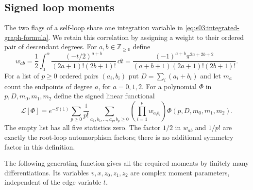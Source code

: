 \subsection{Signed loop moments}
\label{subsec:a:02}

The two flags of a self-loop share one integration variable in
\eqref{eq:s03:integrated-graph-formula}. We retain this correlation by
assigning a weight to their ordered pair of descendant degrees. For
$a,b\in\mathbb Z_{\geq0}$ define
\begin{equation}\label{eq:a:paired-weight}
 w_{ab}=\frac12\int_0^{\alpha}
       \frac{(-t/2)^{a+b}}{(2a+1)!(2b+1)!}\,\dd t
 =\frac{(-1)^{a+b}\pi^{2a+2b+2}}
 {(a+b+1)(2a+1)!(2b+1)!}.
\end{equation}
For a list of $p\geq0$ ordered pairs $(a_i,b_i)$ put
$D=\sum_i(a_i+b_i)$ and let $m_a$ count the endpoints of degree $a$,
for $a=0,1,2$. For a polynomial $\Phi$ in $p,D,m_0,m_1,m_2$ define
the signed linear functional
\begin{equation}\label{eq:a:signed-functional}
 \mathcal L[\Phi]=e^{-S(1)}\sum_{p\geq0}\frac1{p!}
 \sum_{a_1,b_1,\ldots,a_p,b_p\geq0}
       \left(\prod_{i=1}^p w_{a_i b_i}\right)
       \Phi(p,D,m_0,m_1,m_2).
\end{equation}
The empty list has all five statistics zero. The factor $1/2$ in
$w_{ab}$ and $1/p!$ are exactly the root-loop automorphism factors;
there is no additional symmetry factor in this definition.

The following generating function gives all the required moments by
finitely many differentiations. Its variables $v,x,z_0,z_1,z_2$ are
complex moment parameters, independent of the edge variable $t$.

